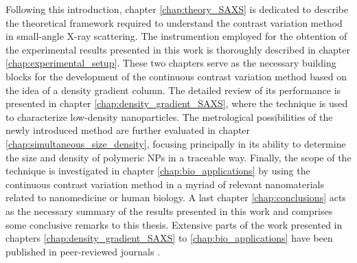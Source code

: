 Following this introduction, chapter \ref{chap:theory_SAXS} is dedicated to describe the theoretical framework required to understand the contrast variation method in small-angle X-ray scattering. The instrumention employed for the obtention of the experimental results presented in this work is thoroughly described in chapter \ref{chap:experimental_setup}. These two chapters serve as the necessary building blocks for the development of the continuous contrast variation method based on the idea of a density gradient column. The detailed review of its performance is presented in chapter \ref{chap:density_gradient_SAXS}, where the technique is used to characterize low-density nanoparticles. The metrological possibilities of the newly introduced method are further evaluated in chapter \ref{chap:simultaneous_size_density}, focusing principally in its ability to determine the size and density of polymeric NPs in a traceable way. Finally, the scope of the technique is investigated in chapter \ref{chap:bio_applications} by using the continuous contrast variation method in a myriad of relevant nanomaterials related to nanomedicine or human biology. A last chapter \ref{chap:conclusions} acts as the necessary summary of the results presented in this work and comprises some conclusive remarks to this thesis. Extensive parts of the work presented in chapters \ref{chap:density_gradient_SAXS} to \ref{chap:bio_applications} have been published in peer-reviewed journals \citep{minelli_characterization_2014,garcia-diez_nanoparticle_2015,garcia-diez_size_2016,garcia-diez_simultaneous_2016-1}.




